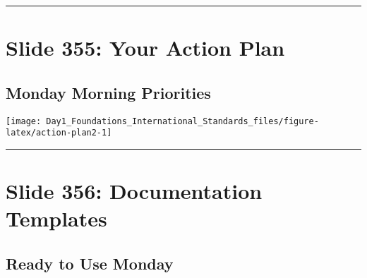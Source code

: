 \documentclass[
]{article}
\begin{document}
\begin{center}\rule{0.5\linewidth}{0.5pt}\end{center}

\section{Slide 355: Your Action Plan}\label{slide-355-your-action-plan}

\subsection{Monday Morning Priorities}\label{monday-morning-priorities}

\texttt{[image: Day1\_Foundations\_International\_Standards\_files/figure-latex/action-plan2-1]}

\begin{center}\rule{0.5\linewidth}{0.5pt}\end{center}

\section{Slide 356: Documentation
Templates}\label{slide-356-documentation-templates}

\subsection{Ready to Use Monday}\label{ready-to-use-monday}
\end{document}
